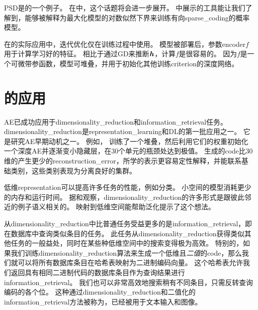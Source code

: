 \gls{PSD}是的一个例子。
在中，这个话题将会进一步展开。
中展示的工具能让我们了解到，能够被解释为最大化模型的对数似然下界来训练有向\gls{sparse_coding}的概率模型。


在的实际应用中，迭代优化仅在训练过程中使用。
模型被部署后，参数\gls{encoder}$f$用于计算学习好的特征。
相比于通过\gls{GD}来推断$\boldsymbol{\mathit{h}}$，计算$f$是很容易的。
因为$f$是一个可微带参函数，模型可堆叠，并用于初始化其他训练\gls{criterion}的深度网络。


\section{的应用}
\label{sec:applications_of_autoencoders}

\gls{AE}已成功应用于\gls{dimensionality_reduction}和\gls{information_retrieval}任务。
\gls{dimensionality_reduction}是\gls{representation_learning}和\gls{DL}的第一批应用之一。
它是研究\gls{AE}早期动机之一。
例如， \citet{Hinton-Science2006}训练了一个堆叠，然后利用它们的权重初始化一个深度\gls{AE}并逐渐变小隐藏层，在30个单元的瓶颈处达到极值。
生成的\gls{code}比30维的产生更少的\gls{reconstruction_error}，所学的表示更容易定性解释，并能联系基础类别，这些类别表现为分离良好的集群。


低维\gls{representation}可以提高许多任务的性能，例如分类。
小空间的模型消耗更少的内存和运行时间。
据\citet{Salakhutdinov+Hinton2007-small}和\citet{Torralba+Fergus+Weiss-2008}观察，\gls{dimensionality_reduction}的许多形式是跟彼此邻近的例子语义相关的。
映射到低维空间能帮助泛化提示了这个想法。


从\gls{dimensionality_reduction}中比普通任务受益更多的是\gls{information_retrieval}，即在数据库中查询类似条目的任务。
此任务从\gls{dimensionality_reduction}获得类似其他任务的一般益处，同时在某些种低维空间中的搜索变得极为高效。
特别的，如果我们训练\gls{dimensionality_reduction}算法来生成一个低维且\emph{二值}的\gls{code}，那么我们就可以将所有数据库条目在哈希表映射为二进制编码向量。
这个哈希表允许我们返回具有相同二进制代码的数据库条目作为查询结果进行\gls{information_retrieval}。
我们也可以非常高效地搜索稍有不同条目，只需反转查询编码的各个位。
这种通过\gls{dimensionality_reduction}和二值化的\gls{information_retrieval}方法被称为\citep{Salakhutdinov+Hinton2007-small,Salakhutdinov+Geoff-2009}，已经被用于文本输入\citep{Salakhutdinov+Hinton2007-small,Salakhutdinov+Geoff-2009}和图像\citep{Torralba+Fergus+Weiss-2008,WeissTF08,KrizhevskyH11}。


